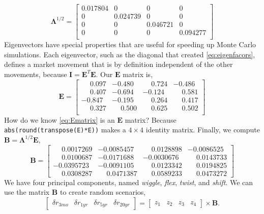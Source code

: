 \documentclass[11pt,twoside]{article}
\numberwithin{equation}{section}
\begin{document}
\begin{equation}
\mathbf{\Lambda}^{1/2}=
\begin{bmatrix}
	0.017804 & 0 & 0 &  0 \\
	0 & 0.024739 & 0 &  0 \\
	0 & 0 & 0.046721 & 0 \\
	0 & 0 & 0 & 0.094277 \\
	\label{eq:eigenfacors}
\end{bmatrix}
\end{equation}
Eigenvectors have special properties that are useful for speeding up Monte Carlo simulations. Each eigenvector, such as the diagonal that created \eqref{eq:eigenfacors}, defines a market movement that is by definition independent of the other movements, because $\mathbf{I}=\mathbf{E}^T\mathbf{E}$. Our $\mathbf{E}$ matrix is,
\begin{equation}
\mathbf{E}=
\begin{bmatrix}
	\phantom{-}0.097 & -0.480 & \phantom{-}0.724 & -0.486 \\
	\phantom{-}0.407 & -0.694 & -0.124 & \phantom{-}0.581 \\
	-0.847 & -0.195 & \phantom{-}0.264 & \phantom{-}0.417 \\
	\phantom{-}0.327 & \phantom{-}0.500 & \phantom{-}0.625 & \phantom{-}0.502 \\
	\label{eq:Ematrix}
\end{bmatrix}
\end{equation}
How do we know \eqref{eq:Ematrix} is an $\mathbf{E}$ matrix? Because \texttt{abs(round(transpose(E)*E))} makes a $4 \times 4$ identity matrix. Finally, we compute $\mathbf{B}=\mathbf{\Lambda}^{1/2} \mathbf{E}$,
\begin{equation}
\mathbf{B}=
\begin{bmatrix}
	\phantom{-}0.0017269 & -0.0085457 & \phantom{-}0.0128898 & -0.0086525 \\
	\phantom{-}0.0100687 & -0.0171688 & -0.0030676 & \phantom{-}0.0143733 \\
	-0.0395723 & -0.0091105 & \phantom{-}0.0123342 & \phantom{-}0.0194825 \\
	\phantom{-}0.0308287 & \phantom{-}0.0471387 & \phantom{-}0.0589233 & \phantom{-}0.0473272
	\label{eq:Bmatrix}
\end{bmatrix}
\end{equation}
We have four principal components, named \emph{wiggle}, \emph{flex}, \emph{twist}, and \emph{shift}. We can use the matrix $\mathbf{B}$ to create random scenarios,
\[
\begin{bmatrix}
\delta r_{3mo} & \delta r_{1yr} & \delta r_{5yr} & \delta r_{20yr}
\end{bmatrix}
=
\begin{bmatrix}
z_1 & z_2 & z_3 & z_4
\end{bmatrix}
\times \mathbf{B}.
\]
\end{document}
